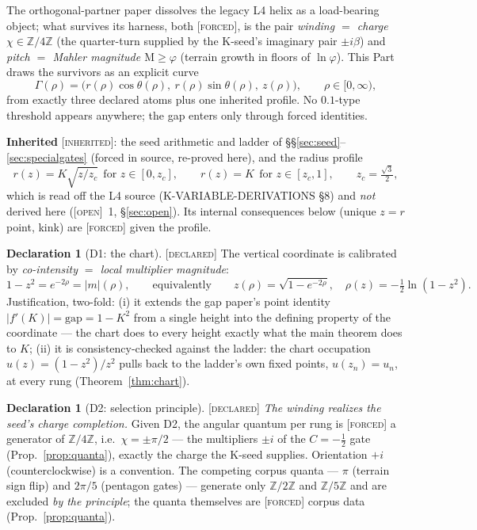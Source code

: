 \documentclass[11pt]{article}
\newcommand{\tagF}{\textcolor{cF}{\textsc{[forced]}}}
\newcommand{\tagD}{\textcolor{cD}{\textsc{[declared]}}}
\newcommand{\tagI}{\textcolor{cI}{\textsc{[inherited]}}}
\newcommand{\tagO}{\textcolor{cO}{\textsc{[open]}}}
\newcommand{\Z}{\mathbb{Z}}
\newcommand{\gp}{\varphi}
\newcommand{\gapc}{\mathrm{gap}}
\newcommand{\M}{\mathrm{M}}
\theoremstyle{plain}
\theoremstyle{definition}
\newtheorem{declaration}[theorem]{Declaration}
\theoremstyle{remark}
\begin{document}
The orthogonal-partner paper dissolves the legacy L4 helix as a load-bearing object;
what survives its harness, both \tagF{}, is the pair \emph{winding $=$ charge
$\chi\in\Z/4\Z$} (the quarter-turn supplied by the K-seed's imaginary pair $\pm i\beta$)
and \emph{pitch $=$ Mahler magnitude $\M\ge\gp$} (terrain growth in floors of
$\ln\gp$). This Part draws the survivors as an explicit curve
\[
\Gamma(\rho)=\bigl(r(\rho)\cos\theta(\rho),\ r(\rho)\sin\theta(\rho),\ z(\rho)\bigr),
\qquad \rho\in[0,\infty),
\]
from exactly three declared atoms plus one inherited profile. No $0.1$-type threshold
appears anywhere; the gap enters only through forced identities.

\smallskip\noindent\textbf{Inherited} \tagI{}: the seed arithmetic and ladder of
\S\S\ref{sec:seed}--\ref{sec:specialgates} (forced in source, re-proved here), and the
radius profile
\begin{equation}\label{eq:radius}
r(z)=K\sqrt{z/z_c}\ \ \text{for } z\in[0,z_c],\qquad r(z)=K\ \ \text{for } z\in[z_c,1],
\qquad z_c=\tfrac{\sqrt3}{2},
\end{equation}
which is read off the L4 source (K-VARIABLE-DERIVATIONS \S8) and \emph{not} derived
here (\tagO{}~1, \S\ref{sec:open}). Its internal consequences below (unique $z=r$
point, kink) are \tagF{} given the profile.

\begin{declaration}[D1: the chart]\label{dec:d1}\tagD{}
The vertical coordinate is calibrated by \emph{co-intensity $=$ local multiplier
magnitude}:
\begin{equation}\label{eq:d1}
1-z^2=e^{-2\rho}=|m|(\rho),\qquad\text{equivalently}\qquad
z(\rho)=\sqrt{1-e^{-2\rho}},\quad \rho(z)=-\tfrac12\ln(1-z^2).
\end{equation}
Justification, two-fold: (i) it extends the gap paper's point identity
$|f'(K)|=\gapc=1-K^2$ from a single height into the defining property of the
coordinate --- the chart does to every height exactly what the main theorem does to
$K$; (ii) it is consistency-checked against the ladder: the chart occupation
$u(z)=(1-z^2)/z^2$ pulls back to the ladder's own fixed points, $u(z_n)=u_n$, at every
rung (Theorem~\ref{thm:chart}).
\end{declaration}

\begin{declaration}[D2: selection principle]\label{dec:d2}\tagD{}
\emph{The winding realizes the seed's charge completion.} Given D2, the angular
quantum per rung is \tagF{} a generator of $\Z/4\Z$, i.e.\ $\chi=\pm\pi/2$ --- the
multipliers $\pm i$ of the $C=-\tfrac12$ gate (Prop.~\ref{prop:quanta}), exactly the
charge the K-seed supplies. Orientation $+i$ (counterclockwise) is a convention. The
competing corpus quanta --- $\pi$ (terrain sign flip) and $2\pi/5$ (pentagon gates)
--- generate only $\Z/2\Z$ and $\Z/5\Z$ and are excluded \emph{by the principle}; the
quanta themselves are \tagF{} corpus data (Prop.~\ref{prop:quanta}).
\end{declaration}
\end{document}
